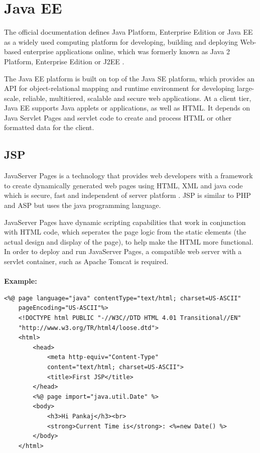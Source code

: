 \section{Java EE}
The official documentation defines Java Platform, Enterprise Edition or 
Java EE as a widely used computing platform for developing, building and 
deploying Web-based enterprise applications online, which was formerly known as Java 2 Platform, Enterprise Edition 
or J2EE \cite{JavaEE}.
\par
The Java EE platform is built on top of the Java SE platform, which provides an API for object-relational mapping and runtime environment for developing large-scale, reliable, multitiered, scalable and secure web applications\cite{JEEJSE}.
At a client tier, Java EE supports Java applets or applications, as well as HTML. It depends on Java Servlet Pages and servlet code to create and process HTML or other formatted data for the client\cite{VangieBeal}.
\subsection{JSP}
JavaServer Pages is a technology that provides web developers with a framework to create dynamically generated web pages using HTML, XML and java code which is secure, fast and independent of server platform \cite{ScottMcPherson}. JSP is similar to PHP and ASP but uses the java programming language.
\par
JavaServer Pages have dynamic scripting capabilities that work in conjunction with HTML code, which seperates the page logic from the static elements (the actual design and display of the page), to help make the HTML more functional\cite{JSP}. In order to deploy and run JavaServer Pages, a compatible web server with a servlet container, such as Apache Tomcat is required.\\
\\
\textbf{Example\cite{Pankaj}:}
\begin{verbatim}
<%@ page language="java" contentType="text/html; charset=US-ASCII"
    pageEncoding="US-ASCII"%>
    <!DOCTYPE html PUBLIC "-//W3C//DTD HTML 4.01 Transitional//EN"
    "http://www.w3.org/TR/html4/loose.dtd">
    <html>
        <head>
            <meta http-equiv="Content-Type" 
            content="text/html; charset=US-ASCII">
            <title>First JSP</title>
        </head>
        <%@ page import="java.util.Date" %>
        <body>
            <h3>Hi Pankaj</h3><br>
            <strong>Current Time is</strong>: <%=new Date() %>
        </body>
    </html>
\end{verbatim}
